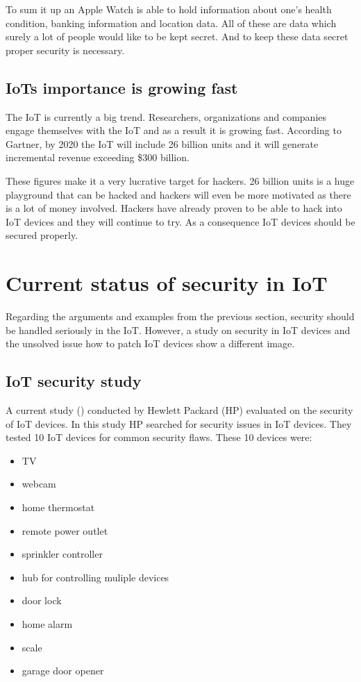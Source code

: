 \documentclass[conference]{IEEEtran}
\begin{document}
To sum it up an Apple Watch is able to hold information about one's health 
condition, banking information and location data. All of these are data which 
surely a lot of people would like to be kept secret. And to keep these data 
secret proper security is necessary.

\subsection{IoTs importance is growing fast}
The IoT is currently a big trend. Researchers, organizations and companies 
engage themselves with the IoT and as a result it is growing fast. According to 
Gartner, by 2020 the IoT will include 26 billion units and it will generate 
incremental revenue exceeding \$300 billion. \cite{gartnerPage}

These figures make it a very lucrative target for hackers. 26 billion units is 
a huge playground that can be hacked and hackers will even be more motivated as 
there is a lot of money involved. Hackers have already proven to be able to 
hack into IoT devices and they will continue to try. As a consequence IoT 
devices should be secured properly.

\section{Current status of security in IoT}
Regarding the arguments and examples from the previous section, security should 
be handled seriously in the IoT. However, a study on security in IoT devices 
and the unsolved issue how to patch IoT devices show a different image.

\subsection{IoT security study}
A current study (\cite{HPstudy}) conducted by Hewlett Packard (HP) evaluated on 
the security of IoT devices. In this study HP searched for security issues in 
IoT devices. They tested 10 IoT devices for common security flaws. These 10 
devices were:

\begin{itemize}
\item TV
\item webcam
\item home thermostat
\item remote power outlet
\item sprinkler controller
\item hub for controlling muliple devices
\item door lock
\item home alarm
\item scale
\item garage door opener
\end{itemize}
\end{document}
